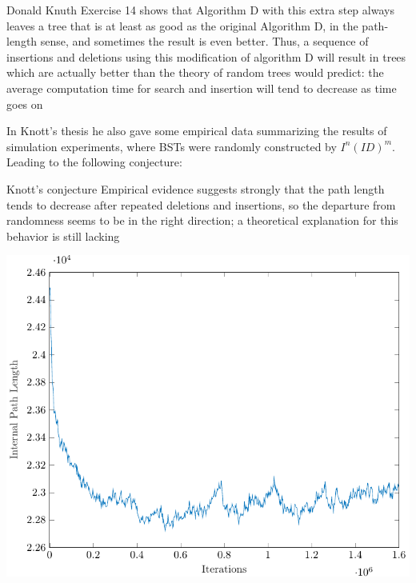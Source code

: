 \documentclass{beamer}
\begin{document}
\begin{frame}
    \begin{block}{Donald Knuth}
        Exercise 14 shows that Algorithm D with this extra step always leaves a tree that is at least as good as the original
        Algorithm D, in the path-length sense, and sometimes the result is even better. Thus, a sequence of insertions and deletions using
        this modification of algorithm D will result in trees which are actually better than the theory of random trees would predict: the
        average computation time for search and insertion will tend to decrease as time goes on
    \end{block}
\end{frame}

\begin{frame}
    In Knott's thesis he also gave some empirical data summarizing the results of simulation experiments, where BSTs were randomly constructed by $I^n(ID)^m$. Leading to the following conjecture:
    \begin{block}{Knott's conjecture}
        Empirical evidence suggests strongly that the path length tends to decrease after repeated deletions and insertions, so the
        departure from randomness seems to be in the right direction; a theoretical explanation for this behavior is still lacking
    \end{block}
\end{frame}

\begin{frame}
    \begin{center}
        \includegraphics[scale=0.75]{iplDelete.pdf}
    \end{center}
\end{frame}
\end{document}
